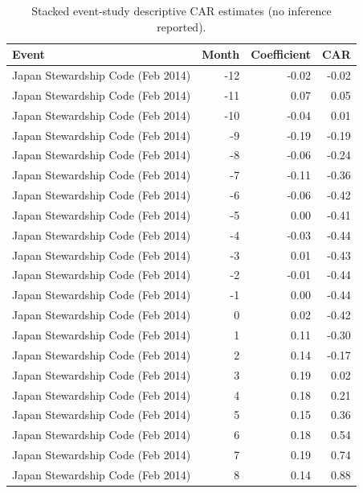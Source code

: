 \begin{table}
\caption{Stacked event-study descriptive CAR estimates (no inference reported).}
\label{tab:event_study_coefs}
\begin{tabular}{lrrr}
\toprule
Event & Month & Coefficient & CAR \\
\midrule
Japan Stewardship Code (Feb 2014) & -12 & -0.02 & -0.02 \\
Japan Stewardship Code (Feb 2014) & -11 & 0.07 & 0.05 \\
Japan Stewardship Code (Feb 2014) & -10 & -0.04 & 0.01 \\
Japan Stewardship Code (Feb 2014) & -9 & -0.19 & -0.19 \\
Japan Stewardship Code (Feb 2014) & -8 & -0.06 & -0.24 \\
Japan Stewardship Code (Feb 2014) & -7 & -0.11 & -0.36 \\
Japan Stewardship Code (Feb 2014) & -6 & -0.06 & -0.42 \\
Japan Stewardship Code (Feb 2014) & -5 & 0.00 & -0.41 \\
Japan Stewardship Code (Feb 2014) & -4 & -0.03 & -0.44 \\
Japan Stewardship Code (Feb 2014) & -3 & 0.01 & -0.43 \\
Japan Stewardship Code (Feb 2014) & -2 & -0.01 & -0.44 \\
Japan Stewardship Code (Feb 2014) & -1 & 0.00 & -0.44 \\
Japan Stewardship Code (Feb 2014) & 0 & 0.02 & -0.42 \\
Japan Stewardship Code (Feb 2014) & 1 & 0.11 & -0.30 \\
Japan Stewardship Code (Feb 2014) & 2 & 0.14 & -0.17 \\
Japan Stewardship Code (Feb 2014) & 3 & 0.19 & 0.02 \\
Japan Stewardship Code (Feb 2014) & 4 & 0.18 & 0.21 \\
Japan Stewardship Code (Feb 2014) & 5 & 0.15 & 0.36 \\
Japan Stewardship Code (Feb 2014) & 6 & 0.18 & 0.54 \\
Japan Stewardship Code (Feb 2014) & 7 & 0.19 & 0.74 \\
Japan Stewardship Code (Feb 2014) & 8 & 0.14 & 0.88 \\

\end{tabular}
\end{table}
